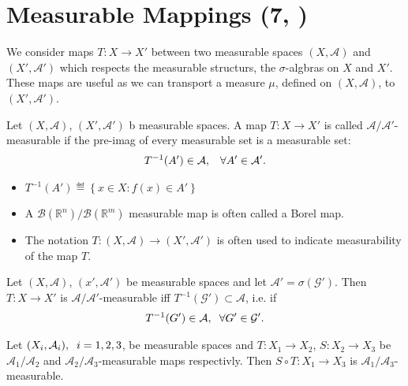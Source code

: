 \section{Measurable Mappings \tiny{ (7, \cite{schilling2017measures})}}

    We consider maps $T:X\rightarrow X'$ between two measurable spaces $(X,\mathcal A)$ and $(X',\mathcal A')$ which respects the measurable 
    structurs, the $\sigma$-algbras on $X$ and $X'$. These maps are useful as we can transport a measure $\mu$, defined on $(X,\mathcal A)$, to $(X',\mathcal A')$.

    

    \begin{definition}
        Let $(X,\mathcal A)$, $(X',\mathcal A')$ b measurable spaces. A map $T:X\rightarrow X'$ is called $\mathcal A/\mathcal A'$-measurable if the pre-imag of every measurable set is a measurable set: 
        \begin{align*}
        T^{-1}(A')\in \mathcal A,\hspace{3mm} \forall A'\in\mathcal A'.    
        \end{align*}

    \end{definition}
    \begin{itemize}
        \item \(T^{-1}(A') \eqdef \left\{ x\in X: f(x) \in A' \right\}\)
        \item A $\mathcal B(\mathbb R^n)/\mathcal B(\mathbb R^m)$ measurable map is often called a Borel map. 
        \item The notation $T:(X,\mathcal A)\rightarrow (X',\mathcal A')$ is often used to indicate measurability of the map $T$.
    \end{itemize}

    \begin{lemma}
        Let $(X,\mathcal A)$, $(x',\mathcal A')$ be measurable spaces and let $\mathcal A' = \sigma(\mathcal G')$. Then $T:X\rightarrow X'$ is $\mathcal A/\mathcal A'$-measurable iff $T^{-1}(\mathcal G')\subset \mathcal A$, i.e. if 
        \begin{align*}
            T^{-1}(G')\in\mathcal A,\hspace{2mm} \forall G'\in\mathcal G'.
        \end{align*} 
    \end{lemma}


	\begin{theorem}

        Let $(X_i,\mathcal A_i),\hspace{2mm}i=1,2,3$, be measurable spaces and $T:X_1\rightarrow X_2$, $S:X_2\rightarrow X_3$ be $\mathcal A_1/\mathcal A_2$ and $\mathcal A_2/\mathcal A_3$-measurable maps respectivly. Then $S\circ T:X_1\rightarrow X_3$ is $\mathcal A_1/\mathcal A_3$-measurable. 

	\end{theorem}

